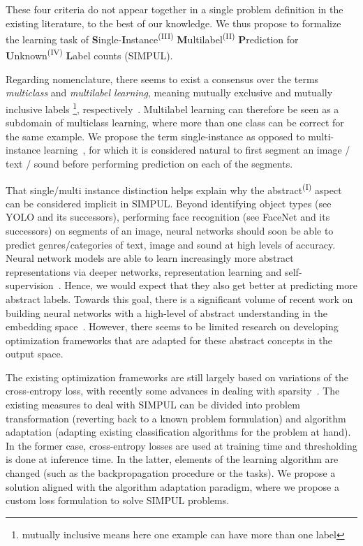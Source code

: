 These four criteria do not appear together in a single problem definition in the existing literature, to the best of our knowledge. We thus propose to formalize the learning task of \textbf{S}ingle-\textbf{I}nstance\textsuperscript{(III)} \textbf{M}ultilabel\textsuperscript{(II)} \textbf{P}rediction for \textbf{U}nknown\textsuperscript{(IV)} \textbf{L}abel counts (SIMPUL).

Regarding nomenclature, there seems to exist a consensus over the terms \emph{multiclass} and \emph{multilabel learning}, meaning mutually exclusive and mutually inclusive labels \footnote{mutually inclusive means here one example can have more than one label}, respectively~\cite{multilabelMethods}. Multilabel learning can therefore be seen as a subdomain of multiclass learning, where more than one class can be correct for the same example. We propose the term single-instance as opposed to multi-instance learning~\citep[e.g.,][]{multiInstance, multiInstanceMultiLabel}, for which it is considered natural to first segment an image / text / sound before performing prediction on each of the segments.

That single/multi instance distinction helps explain why the abstract\textsuperscript{(I)} aspect can be considered implicit in SIMPUL. Beyond identifying object types (see YOLO \cite{YOLO} and its successors), performing face recognition (see FaceNet \cite{FaceNet} and its successors) on segments of an image, neural networks should soon be able to predict genres/categories of text, image and sound at high levels of accuracy. Neural network models are able to learn increasingly more abstract representations via deeper networks, representation learning and self-supervision~\citep[see, e.g.,][]{SS,Rep}. Hence, we would expect that they also get better at predicting more abstract labels. Towards this goal, there is a significant volume of recent work on building neural networks with a high-level of abstract understanding in the embedding space~. However, there seems to be limited research on developing optimization frameworks that are adapted for these abstract concepts in the output space.

The existing optimization frameworks are still largely based on variations of the cross-entropy loss, with recently some advances in dealing with sparsity~\citep[see, e.g.,][]{focalLoss,tencent}. The existing measures to deal with SIMPUL can be divided into problem transformation (reverting back to a known problem formulation) and algorithm adaptation (adapting existing classification algorithms for the problem at hand). In the former case, cross-entropy losses are used at training time and thresholding is done at inference time. In the latter, elements of the learning algorithm are changed (such as the backpropagation procedure or the tasks). We propose a solution aligned with the algorithm adaptation paradigm, where we propose a custom loss formulation to solve SIMPUL problems.

